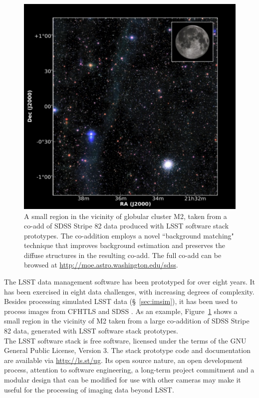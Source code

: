 \documentclass[11pt,twoside]{article}
\begin{document}
\begin{figure}[!t]
%
%
\includegraphics[width=1.0\hsize,clip]{DMStripe82.pdf}
\caption{
A small region in the vicinity of globular cluster M2, taken from a co-add of
SDSS Stripe 82 data produced with LSST software stack prototypes.  The
co-addition employs a novel ``background matching" technique that improves
background estimation and preserves the diffuse structures in the resulting
co-add.  The full co-add can be browsed at \url{http://moe.astro.washington.edu/sdss}.}
\label{Fig:DMStripe82}
\end{figure}


The LSST data management software has been prototyped for over eight
years. It has been exercised in eight data challenges, with increasing
degrees of complexity. Besides processing simulated LSST data
(\S~\ref{sec:imsim}), it has been used to process images from CFHTLS
and SDSS \citep{2009ApJS..182..543A}. As an example,
Figure~\ref{Fig:DMStripe82} shows a small region in the vicinity of M2
taken from a large co-addition of SDSS Stripe 82 data, generated with LSST
software stack prototypes.
\\

The LSST software stack is free software, licensed under the terms of the GNU General
Public License, Version 3. The stack
prototype code and documentation are available via \url{http://ls.st/ug}.
Its open source nature, an open development
process, attention to software engineering, a long-term project
commitment and a modular design that can be modified for use with
other cameras
may make it useful for the processing of imaging data beyond LSST.
\end{document}
